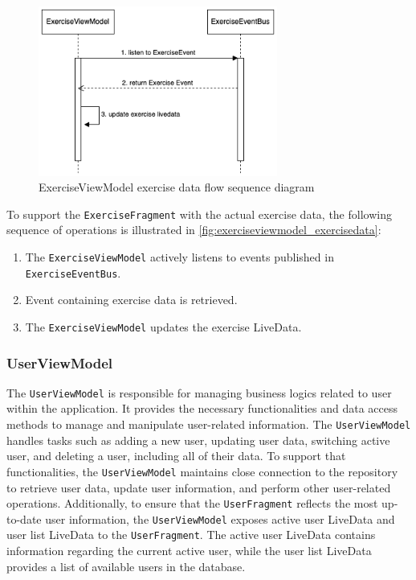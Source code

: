 \begin{figure}[H]
    \centering
    \includegraphics[width=0.7\textwidth]{diagrams/exercise-view-model-seq.drawio.png}
    \caption{ExerciseViewModel exercise data flow sequence diagram}
    \label{fig:exerciseviewmodel_exercisedata}
\end{figure}
To support the \texttt{ExerciseFragment} with the actual exercise data, the following sequence of operations is illustrated in \autoref{fig:exerciseviewmodel_exercisedata}:
\begin{enumerate}
    \item The \texttt{ExerciseViewModel} actively listens to events published in \texttt{ExerciseEventBus}.
    \item Event containing exercise data is retrieved.
    \item The \texttt{ExerciseViewModel} updates the exercise LiveData.
\end{enumerate}

\subsubsection{UserViewModel}
\label{chap:userviewmodel_design}
The \texttt{UserViewModel} is responsible for managing business logics related to user within the application.
It provides the necessary functionalities and data access methods to manage and manipulate user-related information. 
The \texttt{UserViewModel} handles tasks such as adding a new user, updating user data, switching active user, and deleting a user, including all of their data.
To support that functionalities, the \texttt{UserViewModel} maintains close connection to the repository to retrieve user data, update user information, and perform other user-related operations. 
Additionally, to ensure that the \texttt{UserFragment} reflects the most up-to-date user information, the \texttt{UserViewModel} exposes active user LiveData and user list LiveData to the \texttt{UserFragment}.
The active user LiveData contains information regarding the current active user, while the user list LiveData provides a list of available users in the database.

